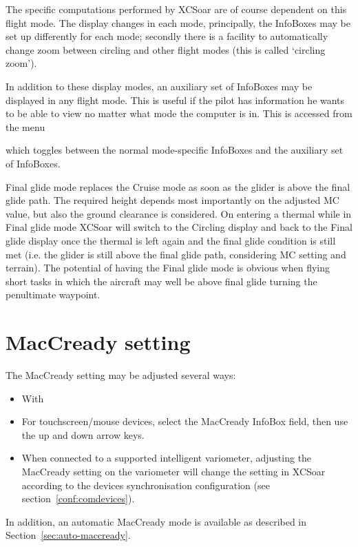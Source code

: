 The specific computations performed by XCSoar are of course dependent
on this flight mode.  The display changes in each mode, principally,
the InfoBoxes may be set up differently for each mode; secondly there
is a facility to automatically change zoom between circling and other
flight modes (this is called `circling zoom').

In addition to these display modes, an auxiliary set of InfoBoxes may
be displayed in any flight mode.  This is useful if the pilot has
information he wants to be able to view no matter what mode the
computer is in.  This is accessed from the menu
\begin{quote}
\blink{}
\end{quote}

which toggles between the normal mode-specific InfoBoxes and
the auxiliary set of InfoBoxes.

Final glide mode replaces the Cruise mode as soon as the glider is
above the final glide path. The required height depends most
importantly on the adjusted MC value, but also the ground clearance is
considered. On entering a thermal while in Final glide mode XCSoar
will switch to the Circling display and back to the Final glide
display once the thermal is left again and the final glide condition
is still met (i.e. the glider is still above the final glide path,
considering MC setting and terrain). The potential of having the Final
glide mode is obvious when flying short tasks in which the aircraft
may well be above final glide turning the penultimate waypoint.

\section{MacCready setting}

The MacCready setting may be adjusted several ways:
\begin{itemize}
\item With \blink{}
\item For touchscreen/mouse devices, select the MacCready InfoBox field, then
  use the up and down arrow keys.
\item When connected to a supported intelligent variometer, adjusting
  the MacCready setting on the variometer will change the setting
  in XCSoar according to the devices synchronisation configuration (see 
  section~\ref{conf:comdevices}).
\end{itemize}
In addition, an automatic MacCready mode is available as described in
Section~\ref{sec:auto-maccready}.

